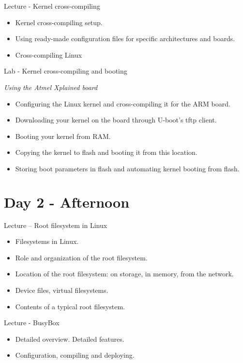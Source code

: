 \documentclass[a4paper,12pt,obeyspaces,spaces,hyphens]{article}
\begin{document}
\feagendatwocolumn
{Lecture - Kernel cross-compiling}
{
  \begin{itemize}
  \item Kernel cross-compiling setup.
  \item Using ready-made configuration files for specific architectures and boards.
  \item Cross-compiling Linux  \end{itemize}
}
{Lab - Kernel cross-compiling and booting}
{
  {\em Using the Atmel Xplained board}
  \begin{itemize}
  \item Configuring the Linux kernel and cross-compiling it for the ARM board.
  \item Downloading your kernel on the board through U-boot's tftp client.
  \item Booting your kernel from RAM.
  \item Copying the kernel to flash and booting it from this location.
  \item Storing boot parameters in flash and automating kernel booting from flash.
  \end{itemize}
}

\section{Day 2 - Afternoon}

\feagendatwocolumn
{Lecture – Root filesystem in Linux}
{
  \begin{itemize}
  \item Filesystems in Linux.
  \item Role and organization of the root filesystem.
  \item Location of the root filesystem: on storage, in memory,
        from the network.
  \item Device files, virtual filesystems.
  \item Contents of a typical root filesystem.
  \end{itemize}
}
{Lecture - BusyBox}
{
  \begin{itemize}
  \item Detailed overview. Detailed features.
  \item Configuration, compiling and deploying.
  \end{itemize}
}
\end{document}

